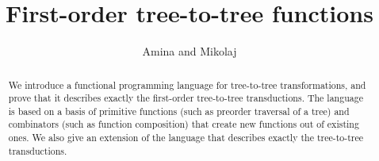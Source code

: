 \documentclass[sigplan,10pt,manonymous]{acmart}\settopmatter{printfolios=true,printccs=false,printacmref=false}
\begin{document}
 \title{First-order tree-to-tree functions}
 \author{Amina and Mikolaj}
 \begin{abstract}
    We introduce a functional programming language for tree-to-tree transformations, and prove  that it describes exactly the first-order tree-to-tree transductions. The language is based on a basis of  primitive functions (such as preorder traversal of a tree)  and 
    combinators (such as function composition) that create new functions out of existing ones. We also give an extension of the language that describes exactly the \mso tree-to-tree transductions.
\end{abstract}

 \maketitle






%


%


%
%






\appendix






% 
\end{document}
